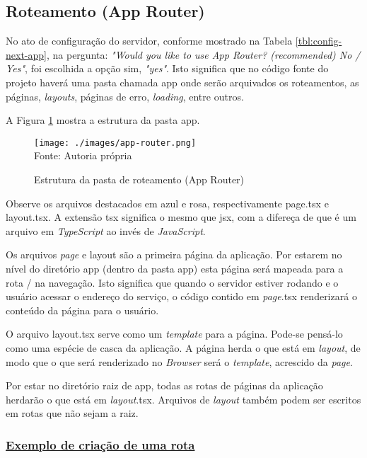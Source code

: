 \subsection{Roteamento (App Router)}

No ato de configuração do servidor, conforme mostrado na
Tabela \ref{tbl:config-next-app},
na pergunta:
\textit{"Would you like to use App Router? (recommended) No / Yes"},
foi escolhida a opção sim, \textit{"yes"}.
Isto significa que no código fonte do projeto haverá uma pasta
chamada
\acrshort{app}
onde serão arquivados os roteamentos, as páginas,
\textit{layouts}, páginas de erro, \textit{loading}, entre outros.

A
Figura \ref{fig:app-router}
mostra a estrutura da pasta
\acrshort{app}.

\begin{figure}[H]
    \centering
    \caption{Estrutura da pasta de roteamento (App Router)}
    \texttt{[image: ./images/app-router.png]}
    \label{fig:app-router} \\
    \textnormal{\fontsize{10pt}{12pt}Fonte: Autoria própria}
\end{figure}

Observe os arquivos destacados em azul e rosa, respectivamente
page.tsx e  layout.tsx. A extensão
\acrshort{tsx}
significa o mesmo que
\acrshort{jsx},
com a difereça de que é um arquivo em \textit{TypeScript} ao
invés de \textit{JavaScript}.

Os arquivos \textit{page} e layout são a primeira página da aplicação.
Por estarem no nível do diretório
\acrshort{app} (dentro da pasta app)
esta página será mapeada para a rota / na navegação. Isto
significa que quando o servidor estiver rodando e o usuário
acessar o endereço do serviço, o código contido em
\textit{page}.tsx renderizará o conteúdo da página para o
usuário.

O arquivo layout.tsx serve como um \textit{template} para a página.
Pode-se pensá-lo como uma espécie de casca da aplicação.
A página herda o que está em \textit{layout}, de modo que o que será
renderizado no \textit{Browser} será o \textit{template}, acrescido da \textit{page}.

Por estar no diretório raiz de app, todas as rotas de páginas
da aplicação herdarão o que está em \textit{layout}.tsx. Arquivos de 
\textit{layout} também podem ser escritos em rotas que não sejam a raiz.

\subsubsection{\underline{Exemplo de criação de uma rota}}

